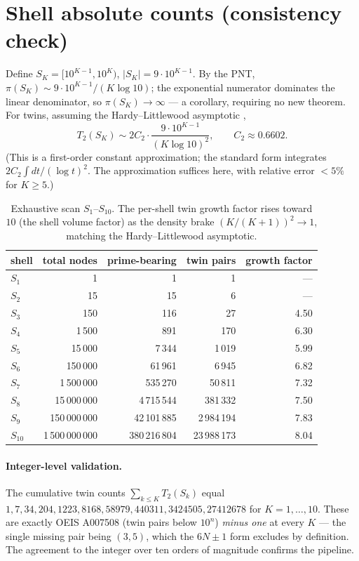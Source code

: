 \documentclass[11pt]{article}
\theoremstyle{definition}
\theoremstyle{remark}
\begin{document}
\section{Shell absolute counts (consistency check)}

Define $S_K=[10^{K-1},10^K)$, $|S_K|=9\cdot10^{K-1}$. By the PNT,
$\pi(S_K)\sim 9\cdot10^{K-1}/(K\log10)$; the exponential numerator dominates the
linear denominator, so $\pi(S_K)\to\infty$ --- a corollary, requiring no new
theorem. For twins, assuming the Hardy--Littlewood asymptotic \cite{HL},
\[
  T_2(S_K)\sim 2C_2\cdot \frac{9\cdot10^{K-1}}{(K\log10)^2},\qquad C_2\approx0.6602.
\]
(This is a first-order constant approximation; the standard form integrates
$2C_2\int dt/(\log t)^2$. The approximation suffices here, with relative error
$<5\%$ for $K\ge5$.)

\begin{table}[h]\centering
\begin{tabular}{lrrrr}
\toprule
shell & total nodes & prime-bearing & twin pairs & growth factor\\
\midrule
$S_1$ & 1 & 1 & 1 & ---\\
$S_2$ & 15 & 15 & 6 & ---\\
$S_3$ & 150 & 116 & 27 & 4.50\\
$S_4$ & 1\,500 & 891 & 170 & 6.30\\
$S_5$ & 15\,000 & 7\,344 & 1\,019 & 5.99\\
$S_6$ & 150\,000 & 61\,961 & 6\,945 & 6.82\\
$S_7$ & 1\,500\,000 & 535\,270 & 50\,811 & 7.32\\
$S_8$ & 15\,000\,000 & 4\,715\,544 & 381\,332 & 7.50\\
$S_9$ & 150\,000\,000 & 42\,101\,885 & 2\,984\,194 & 7.83\\
$S_{10}$ & 1\,500\,000\,000 & 380\,216\,804 & 23\,988\,173 & 8.04\\
\bottomrule
\end{tabular}
\caption{Exhaustive scan $S_1$--$S_{10}$. The per-shell twin growth factor rises
toward $10$ (the shell volume factor) as the density brake $(K/(K{+}1))^2\to1$,
matching the Hardy--Littlewood asymptotic.}
\label{tab:counts}
\end{table}

\paragraph{Integer-level validation.}
The cumulative twin counts $\sum_{k\le K}T_2(S_k)$ equal
$1,7,34,204,1223,8168,58979,440311,3424505,27412678$ for $K=1,\dots,10$. These are
exactly OEIS A007508 (twin pairs below $10^n$) \emph{minus one} at every $K$ --- the
single missing pair being $(3,5)$, which the $6N\pm1$ form excludes by definition.
The agreement to the integer over ten orders of magnitude confirms the pipeline.
\end{document}
